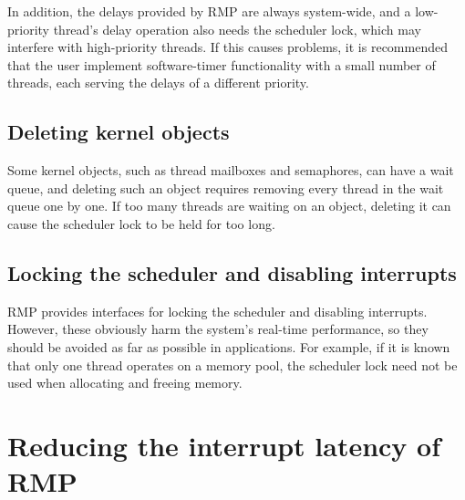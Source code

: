 In addition, the delays provided by RMP are always system-wide, and a low-priority thread's delay operation also needs the scheduler lock, which may interfere with high-priority threads.
If this causes problems, it is recommended that the user implement software-timer functionality with a small number of threads, each serving the delays of a different priority.

\subsection{Deleting kernel objects}

Some kernel objects, such as thread mailboxes and semaphores, can have a wait queue, and deleting such an object requires removing every thread in the wait queue one by one.
If too many threads are waiting on an object, deleting it can cause the scheduler lock to be held for too long.

\subsection{Locking the scheduler and disabling interrupts}

RMP provides interfaces for locking the scheduler and disabling interrupts.
However, these obviously harm the system's real-time performance, so they should be avoided as far as possible in applications.
For example, if it is known that only one thread operates on a memory pool, the scheduler lock need not be used when allocating and freeing memory.

\section{Reducing the interrupt latency of RMP}

